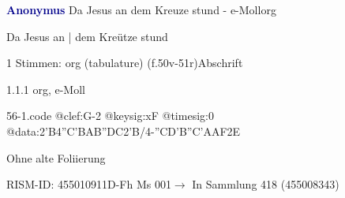\documentclass[twocolumn, 12pt]{book}
\begin{document}
\par \vspace{16pt} \textcolor{darkblue}{\textbf{Anonymus  }}\hfillplus{\textbf{[56]}}\newline Da Jesus an dem Kreuze stund - e-Moll\newline org
\par \begin{itshape}[f.50v, at left:] Da Jesus an | dem Kreütze stund\end{itshape} 
\par \textcolor{darkblue}{}  1 Stimmen: org (tabulature)  (f.50v-51r)\newline Abschrift
\par 1.1.1  org, e-Moll  
\begin{filecontents*}{56-1.code}
@clef:G-2
@keysig:xF
@timesig:0
@data:2'B4''C'BAB''DC2'B/4-''CD'B''C'AAF2E
\end{filecontents*}
\newline %
\par Ohne alte Foliierung
\par RISM-ID: 455010911\newline D-Fh  Ms 001\newline $\rightarrow$ In Sammlung 418 (455008343)
      
\end{document}
